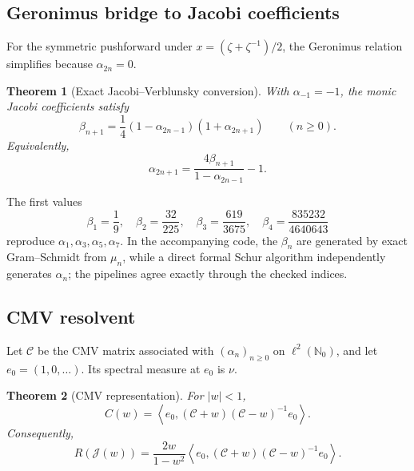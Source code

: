 \documentclass[11pt,oneside]{article}
\newtheorem{theorem}{Theorem}[section]
\theoremstyle{definition}
\newcommand{\N}{\mathbb N}
\newcommand{\Jouk}{\mathcal J}
\newcommand{\CMV}{\mathcal C}
\begin{document}
\subsection{Geronimus bridge to Jacobi coefficients}

For the symmetric pushforward under \(x=(\zeta+\zeta^{-1})/2\), the Geronimus relation
simplifies because \(\alpha_{2n}=0\).

\begin{theorem}[Exact Jacobi--Verblunsky conversion]
\label{thm:Geronimus}
With \(\alpha_{-1}=-1\), the monic Jacobi coefficients satisfy
\begin{equation}
 \boxed{\displaystyle
 \beta_{n+1}=\frac14(1-\alpha_{2n-1})(1+\alpha_{2n+1})}
 \qquad(n\ge0).
 \label{eq:Geronimus}
\end{equation}
Equivalently,
\begin{equation}
 \alpha_{2n+1}=\frac{4\beta_{n+1}}{1-\alpha_{2n-1}}-1.
 \label{eq:alpha-from-beta}
\end{equation}
\end{theorem}

The first values
\begin{equation}
 \beta_1=\frac19,\quad
 \beta_2=\frac{32}{225},\quad
 \beta_3=\frac{619}{3675},\quad
 \beta_4=\frac{835232}{4640643}
 \label{eq:first-betas}
\end{equation}
reproduce \(\alpha_1,\alpha_3,\alpha_5,\alpha_7\). In the accompanying code, the
\(\beta_n\) are generated by exact Gram--Schmidt from \(\mu_n\), while a direct formal Schur
algorithm independently generates \(\alpha_n\); the pipelines agree exactly through the
checked indices.

\subsection{CMV resolvent}

Let \(\CMV\) be the CMV matrix associated with \((\alpha_n)_{n\ge0}\) on
\(\ell^2(\N_0)\), and let \(e_0=(1,0,\ldots)\). Its spectral measure at \(e_0\) is \(\nu\).

\begin{theorem}[CMV representation]
\label{thm:CMV}
For \(|w|<1\),
\begin{equation}
 C(w)=\left\langle e_0,(\CMV+w)(\CMV-w)^{-1}e_0\right\rangle.
 \label{eq:C-CMV}
\end{equation}
Consequently,
\begin{equation}
 R(\Jouk(w))=\frac{2w}{1-w^2}
 \left\langle e_0,(\CMV+w)(\CMV-w)^{-1}e_0\right\rangle.
 \label{eq:R-CMV}
\end{equation}
\end{theorem}
\end{document}
